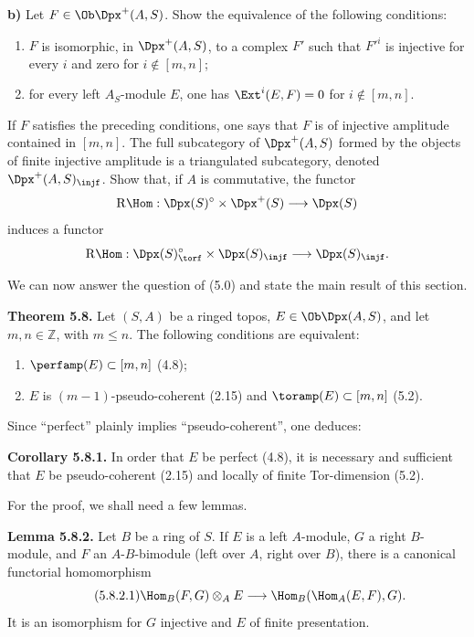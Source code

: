 \textbf{b)} Let \(F\in\Ob\Dpx^+(A,S)\)\footnotemark[\value{footnote}]. Show the equivalence of the following conditions:
\begin{enumerate}[label=(\roman*)]
\item \(F\) is isomorphic, in \(\Dpx^+(A,S)\), to a complex \(F'\) such that \(F'^i\) is injective for every \(i\) and zero for \(i\notin[m,n]\);
\item for every left \(A_S\)-module \(E\), one has \(\Ext^i(E,F)=0\) for \(i\notin[m,n]\).
\end{enumerate}
If \(F\) satisfies the preceding conditions, one says that \(F\) is of injective amplitude contained in \([m,n]\). The full subcategory of \(\Dpx^+(A,S)\) formed by the objects of finite injective amplitude is a triangulated subcategory, denoted \(\Dpx^+(A,S)_{\injf}\). Show that, if \(A\) is commutative, the functor
\[
  \mathrm R\Hom:\Dpx(S)^\circ\times\Dpx^+(S)\longrightarrow \Dpx(S)
\]
induces a functor
\[
  \mathrm R\Hom:\Dpx(S)^\circ_{\torf}\times\Dpx(S)_{\injf}
  \longrightarrow \Dpx(S)_{\injf}.
\]

We can now answer the question of (5.0) and state the main result of this section.

\textbf{Theorem 5.8.} Let \((S,A)\) be a ringed topos, \(E\in\Ob\Dpx(A,S)\), and let \(m,n\in\mathbb Z\), with \(m\leq n\). The following conditions are equivalent:
\begin{enumerate}[label=(\roman*)]
\item \(\perfamp(E)\subset[m,n]\) (4.8);
\item \(E\) is \((m-1)\)-pseudo-coherent (2.15) and \(\toramp(E)\subset[m,n]\) (5.2).
\end{enumerate}
Since ``perfect'' plainly implies ``pseudo-coherent'', one deduces:

\textbf{Corollary 5.8.1.} In order that \(E\) be perfect (4.8), it is necessary and sufficient that \(E\) be pseudo-coherent (2.15) and locally of finite Tor-dimension (5.2).

For the proof, we shall need a few lemmas.

\textbf{Lemma 5.8.2.} Let \(B\) be a ring of \(S\). If \(E\) is a left \(A\)-module, \(G\) a right \(B\)-module, and \(F\) an \(A\)-\(B\)-bimodule (left over \(A\), right over \(B\)), there is a canonical functorial homomorphism
\begin{equation}\tag{5.8.2.1}
  \Hom_B(F,G)\otimes_A E
  \longrightarrow
  \Hom_B(\Hom_A(E,F),G).
\end{equation}
It is an isomorphism for \(G\) injective and \(E\) of finite presentation.

